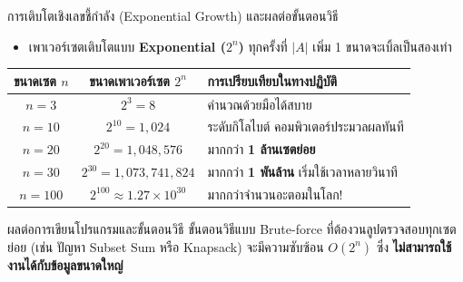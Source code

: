 \begin{frame}{การเติบโตเชิงเลขชี้กำลัง (Exponential Growth) และผลต่อขั้นตอนวิธี}
  \begin{itemize}
    \item เพาเวอร์เซตเติบโตแบบ \textbf{Exponential ($2^n$)} ทุกครั้งที่ $|A|$ เพิ่ม 1 ขนาดจะเบิ้ลเป็นสองเท่า
  \end{itemize}
  \begin{center}\small
  \begin{tabular}{|c|c|l|}
    \hline
    \textbf{ขนาดเซต $n$} & \textbf{ขนาดเพาเวอร์เซต $2^n$} & \textbf{การเปรียบเทียบในทางปฏิบัติ} \\ \hline
    $n = 3$ & $2^3 = 8$ & คำนวณด้วยมือได้สบาย \\ \hline
    $n = 10$ & $2^{10} = 1,024$ & ระดับกิโลไบต์ คอมพิวเตอร์ประมวลผลทันที \\ \hline
    $n = 20$ & $2^{20} = 1,048,576$ & มากกว่า \textbf{1 ล้านเซตย่อย} \\ \hline
    $n = 30$ & $2^{30} = 1,073,741,824$ & มากกว่า \textbf{1 พันล้าน} เริ่มใช้เวลาหลายวินาที \\ \hline
    $n = 100$ & $2^{100} \approx 1.27 \times 10^{30}$ & มากกว่าจำนวนอะตอมในโลก! \\ \hline
  \end{tabular}
  \end{center}
  \vspace{0.2em}
  \begin{alertblock}{ผลต่อการเขียนโปรแกรมและขั้นตอนวิธี}
    ขั้นตอนวิธีแบบ Brute-force ที่ต้องวนลูปตรวจสอบทุกเซตย่อย (เช่น ปัญหา Subset Sum หรือ Knapsack) จะมีความซับซ้อน $O(2^n)$ ซึ่ง \textbf{ไม่สามารถใช้งานได้กับข้อมูลขนาดใหญ่}
  \end{alertblock}
\end{frame}

